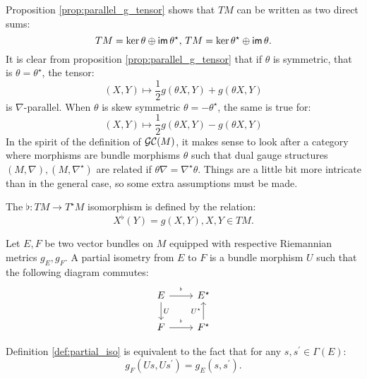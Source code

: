 Proposition  \ref{prop:parallel_g_tensor} shows that $TM$ can be written as two direct sums:
\begin{equation}
    \label{eq:split_tm}
    TM = \ker \theta \oplus \operatorname{\textsf{im}} \theta^\star , \, TM = \ker \theta^\star \oplus \operatorname{\textsf{im}} \theta.
\end{equation}
It is clear from proposition \ref{prop:parallel_g_tensor} that if $\theta$ is symmetric, that is $\theta = \theta^\star$, the tensor:
\begin{equation}
(X,Y) \mapsto \frac{1}{2} g\left( \theta X, Y\right) + g\left( \theta X, Y\right)
\end{equation}
is $\nabla$-parallel.
When $\theta$ is skew symmetric $\theta = -\theta^\star$, the same is true for:
\begin{equation}
(X,Y) \mapsto \frac{1}{2} g\left( \theta X, Y\right) - g\left( \theta X, Y\right)
\end{equation}
In the spirit of the definition of $\mathcal{GC}(M)$, it makes sense to look after a category where morphisms are bundle morphisms $\theta$ such that dual gauge structures $(M,\nabla), (M, \nabla^\star)$ are related if $\theta \nabla = \nabla^\star \theta.$ Things are a little bit more intricate than in the general case, so some extra assumptions must be made.
\begin{defn}
    \label{def:flat_morphism}
    The $\flat \colon TM \to T^\star M$ isomorphism is defined by the relation:
    \begin{equation}
        \label{eq:flat_morphism}
        X^\flat(Y) = g(X, Y), X, Y \in TM.
    \end{equation}
\end{defn}
\begin{defn}
\label{def:partial_iso}
Let $E,F$ be two vector bundles on $M$ equipped with respective Riemannian metrics $g_E,g_F.$ A partial isometry from $E$ to $F$ is a bundle morphism $U$ such that the following diagram commutes:
\begin{equation}
    \label{eq:partial_iso}
    \begin{tikzcd}
        E \ar[r,"{}^\flat"] \ar[d,"U"] & E^\star \\
        F \ar[r,"{}^\flat"] & F^\star \ar[u,"U^\star"]
    \end{tikzcd}
\end{equation}
\end{defn}
\begin{rem}
    Definition \ref{def:partial_iso} is equivalent to the fact that for any $s,s^\prime \in \Gamma(E)$:
    \[
    g_F\left(Us, Us^\prime\right) = g_E\left(s,s^\prime\right).
    \]
\end{rem}
